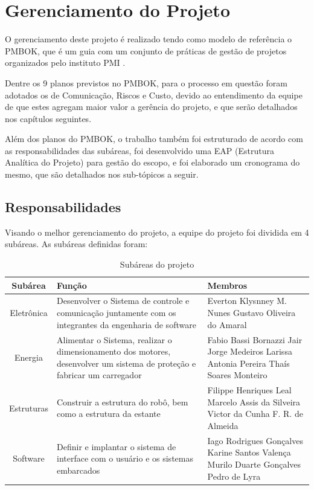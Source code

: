 \chapter[Gerenciamento do Projeto] {Gerenciamento do Projeto}

O gerenciamento deste projeto é realizado tendo como modelo de referência o PMBOK, que é um guia com um conjunto de práticas de gestão de projetos organizados pelo instituto PMI \cite{pmbok2004}.

Dentre os 9 planos previstos no PMBOK, para o processo em questão foram adotados os de Comunicação, Riscos e Custo, devido ao entendimento da equipe de que estes agregam maior valor a gerência do projeto, e que serão detalhados nos capítulos seguintes.

Além dos planos do PMBOK, o trabalho também foi estruturado de acordo com as responsabilidades das subáreas, foi desenvolvido uma EAP (Estrutura Analítica do Projeto) para gestão do escopo, e foi elaborado um cronograma do mesmo, que são detalhados nos sub-tópicos a seguir.

\section{Responsabilidades}
Visando o melhor gerenciamento do projeto, a equipe do projeto foi dividida em 4 subáreas. As subáreas definidas foram:
\begin{table}[h]
\caption{Subáreas do projeto}
\centering
\begin{tabular}{|c|p{5cm}|p{5cm}|} \hline
\textbf{Subárea} & \textbf{Função} & \textbf{Membros}\\ \hline                               
Eletrônica & Desenvolver o Sistema de controle e comunicação juntamente com os integrantes da engenharia de software & Everton Klysnney M. Nunes Gustavo Oliveira do Amaral\\ \hline
Energia & Alimentar o Sistema, realizar o dimensionamento dos motores, desenvolver um sistema de proteção e fabricar um carregador & Fabio Bassi Bornazzi Jair Jorge Medeiros Larissa Antonia Pereira Thaís Soares Monteiro\\ \hline
Estruturas & Construir a estrutura do robô, bem como a estrutura da estante & Filippe Henriques Leal Marcelo Assis da Silveira Victor da Cunha F. R. de Almeida\\ \hline
Software & Definir e implantar o sistema de interface com o usuário e os sistemas embarcados & Iago Rodrigues Gonçalves Karine Santos Valença Murilo Duarte Gonçalves
Pedro de Lyra\\ \hline
\end{tabular}
\end{table}

